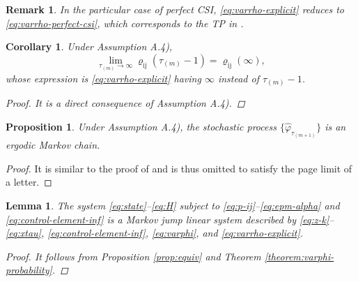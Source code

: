 \documentclass[journal,twoside,web]{ieeecolor}
\newtheorem{corollary}{Corollary}[theorem]
\newtheorem{remark}{Remark}
\newtheorem{lemma}{Lemma}
\newtheorem{proposition}{Proposition}
\begin{document}
\begin{remark}\label{rem:automatica-2}
    In the particular case of perfect CSI, \eqref{eq:varrho-explicit} reduces to \eqref{eq:varrho-perfect-csi}, which corresponds to the TP in \cite[Eq. (30)]{yZL-2025-automatica}.
\end{remark}

\begin{corollary}\label{corollary:varrho-inf}
    Under Assumption A.4), 
\begin{equation}
    \lim_{\tau_{(m)}\to \infty} \varrho_{\mathrm{i}\mathrm{j}}(\tau_{(m)}-1) = \varrho_{\mathrm{i}\mathrm{j}}(\infty),
\end{equation}
whose expression is \eqref{eq:varrho-explicit} having $\infty$ instead of $\tau_{(m)}-1$.

\begin{proof}
    It is a direct consequence of Assumption A.4).
\end{proof}
\end{corollary}

\begin{proposition}\label{prop:ergodicity}
	Under Assumption A.4), the stochastic process $\{\hat{\varphi}_{\tau_{(m+1)}}\}$ is an ergodic Markov chain.
\end{proposition}
\begin{proof}
    It is similar to the proof of \cite[Prop. 15]{yZL-2025-automatica} and is thus omitted to satisfy the page limit of a letter. 
\end{proof}
\begin{lemma}\label{lemma:mjls-stability}
    The system \eqref{eq:state}–\eqref{eq:H} subject to \eqref{eq:p-ij}–\eqref{eq:epm-alpha} and \eqref{eq:control-element-inf} is a Markov jump linear system %
    described by \eqref{eq:z-k}–\eqref{eq:xtau}, \eqref{eq:control-element-inf}, \eqref{eq:varphi}, and \eqref{eq:varrho-explicit}.

\begin{proof}
    It follows from Proposition \ref{prop:equiv} %
    and Theorem \ref{theorem:varphi-probability}.
\end{proof}
\end{lemma}
\end{document}
